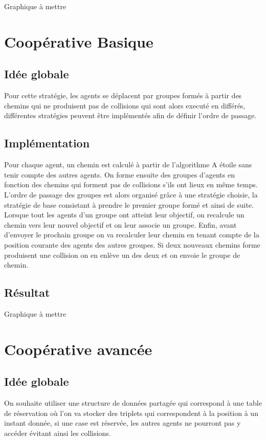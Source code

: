 \documentclass{article}
\begin{document}
			Graphique à mettre
			
		\section{Coopérative Basique}
		
			\subsection{Idée globale}
			Pour cette stratégie, les agents se déplacent par groupes formés à partir des chemins qui ne produisent pas de collisions qui sont alors executé en différés, différentes stratégies peuvent être implémentés afin de définir l'ordre de passage.
		
			\subsection{Implémentation}
			Pour chaque agent, un chemin est calculé à partir de l'algorithme A étoile sans tenir compte des autres agents. On forme ensuite des groupes d'agents en fonction des chemins qui forment pas de collisions s'ils ont lieux en même temps. L'ordre de passage des groupes est alors organisé grâce à une stratégie choisie, la stratégie de base consistant à prendre le premier groupe formé et ainsi de suite. Lorsque tout les agents d'un groupe ont atteint leur objectif, on recalcule un chemin vers leur nouvel objectif et on leur associe un groupe.
			Enfin, avant d'envoyer le prochain groupe on va recalculer leur chemin en tenant compte de la position courante des agents des autres groupes. Si deux nouveaux chemins forme produisent une collision on en enlève un des deux et on envoie le groupe de chemin.
			
			\subsection{Résultat}
			Graphique à mettre
		
		\section{Coopérative avancée}

			\subsection{Idée globale}
			On souhaite utiliser une structure de données partagée qui correspond à une table de réservation où l'on va stocker des triplets qui correspondent à la position à un instant donnée, si une case est réservée, les autres agents ne pourront pas y accéder évitant ainsi les collisions.
\end{document}
